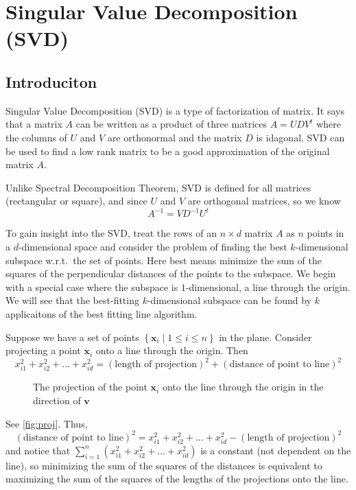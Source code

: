 \chapter{Singular Value Decomposition (SVD)}
\section{Introduciton}
Singular Value Decomposition (SVD) is a type of factorization of matrix.
It says that a matrix \(A\)  can be written as a product of three matrices $A=UDV^t$
where the columns of \(U\) and \(V\) are orthonormal and the matrix \(D\) is idagonal.
SVD can be used to find a low rank matrix to be a good approximation of the original matrix \(A\).

Unlike Spectral Decomposition Theorem, SVD is defined for all matrices (rectangular or square), 
and since \(U\) and \(V\) are orthogonal matrices, so we know
\[
  A^{-1} =VD^{-1} U^t
\]

To gain insight into the SVD, treat the rows of an \(n \times d\) matrix \(A\) as \(n\) points in a
\(d\)-dimensional space and consider the problem of finding the best \(k\)-dimensional subspace w.r.t.\ the set of points.
Here best means minimize the sum of the squares of the perpendicular distances of the points to the subspace. 
We begin with a special case where the subspace is \(1\)-dimensional, a line through the origin. 
We will see that the best-fitting \(k\)-dimensional subspace can be found by \(k\) applicaitons 
of the best fitting line algorithm.

Suppose we have a set of points \(\left\{ \mathbf{x}_i \mid 1 \le i \le n \right\} \) in the plane.
Consider projecting a point \( \mathbf{x}_i\) onto a line through the origin. Then
\[
  x_{i1}^2 + x_{i2}^2 + \dots + x_{id}^2 = \left( \text{length of projection} \right)^2 + \left( \text{distance of point to line} \right)^2  
\]  

\begin{figure}[H]
  \centering
  \caption{The projection of the point \(\mathbf{x}_i\) onto the line through
  the origin in the direction of \(\mathbf{v} \) }
  \label{fig:proj}
\end{figure}

See \autoref{fig:proj}. Thus,
\[
  \left( \text{distance of point to line} \right)^2 = x_{i1}^2 + x_{i2}^2 + \dots + x_{id}^2 -  \left( \text{length of projection} \right)^2 
\]
and notice that \(\sum_{i=1}^{n}\left( x_{i1}^2 + x_{i2}^2 + \dots  + x_{id}^2 \right)  \)
is a constant (not dependent on the line), so minimizing the sum of the squares 
of the distances is equivalent to maximizing the sum of the squares of the lengths 
of the projections onto the line.

